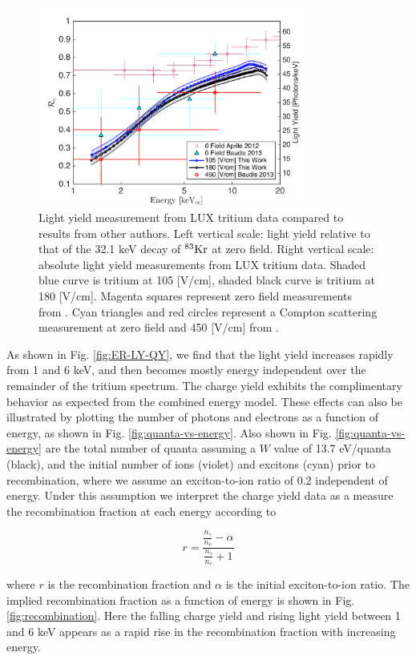 \begin{figure}[h!]\centering
\includegraphics[width=88mm]{fig/Re_LY_log.png}
\caption{Light yield measurement from LUX tritium data compared to results from other authors. Left vertical scale: light yield relative to that of the 32.1 keV decay of $\rm^{83}Kr $ at zero field. Right vertical scale: absolute light yield measurements from LUX tritium data. Shaded blue curve is tritium at 105 [V/cm], shaded black curve is tritium at 180 [V/cm]. Magenta squares represent zero field measurements from \cite{Aprile_LY}. Cyan triangles and red circles represent a Compton scattering measurement at zero field and 450 [V/cm] from \cite{Baudis}. }
\label{fig:Re_LY}
\end{figure}


As shown in Fig. \ref{fig:ER-LY-QY}, we find that the light yield increases rapidly from 1 and 6 keV, and then becomes mostly energy independent over the remainder of the tritium spectrum. The charge yield exhibits the complimentary behavior as expected from the combined energy model. These effects can also be illustrated by plotting the number of photons and electrons as a function of energy, as shown in Fig. \ref{fig:quanta-vs-energy}. Also shown in Fig. \ref{fig:quanta-vs-energy} are the total number of quanta assuming a $W$ value of 13.7 eV/quanta (black), and the initial number of ions (violet) and excitons (cyan) prior to recombination, where we assume an exciton-to-ion ratio of 0.2 \cite{Doke_alpha} independent of energy. Under this assumption we interpret the charge yield data as a measure the recombination fraction at each energy according to

\begin{equation}
r = \frac{\frac{n_{\gamma}}{n_e} - \alpha}{\frac{n_{\gamma}}{n_e} + 1}
\end{equation}

\noindent
where $r$ is the recombination fraction and $\alpha$ is the initial exciton-to-ion ratio. The implied recombination fraction as a function of energy is shown in Fig. \ref{fig:recombination}. Here the falling charge yield and rising light yield between 1 and 6 keV appears as a rapid rise in the recombination fraction with increasing energy. 


